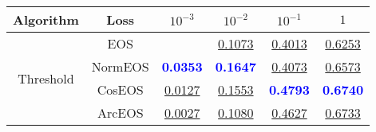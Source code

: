 \begin{table}[t]
\centering
\begin{tabularx}{.7\textwidth}{c|c|cccc}
\bf Algorithm & \bf Loss & $10^{-3}$ & $10^{-2}$ & $10^{-1}$ & $1$\\\hline\hline
\multirow{4}{*}{Threshold} & EOS & & \underline{0.1073} & \underline{0.4013} & \underline{0.6253}\\
 & NormEOS & \textcolor{blue}{\bf 0.0353} & \textcolor{blue}{\bf 0.1647} & \underline{0.4073} & \underline{0.6573}\\
 & CosEOS & \underline{0.0127} & \underline{0.1553} & \textcolor{blue}{\bf 0.4793} & \textcolor{blue}{\bf 0.6740}\\
 & ArcEOS & \underline{0.0027} & \underline{0.1080} & \underline{0.4627} & \underline{0.6733}\\
\hline
\end{tabularx}
\end{table}